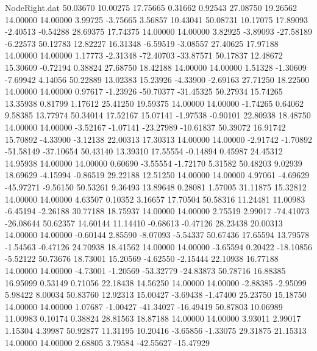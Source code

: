 \begin{filecontents}{NodeRight.dat}
  50.03670   10.00275   17.75665     0.31662    0.92543   27.08750   19.26562   14.00000   14.00000    3.99725   -3.75665    3.56857   10.43041
  50.08731   10.17075   17.89093    -2.40513   -0.54288   28.69375   17.74375   14.00000   14.00000    3.82925   -3.89093  -27.58189   -6.22573
  50.12783   12.82227   16.31348    -6.59519   -3.08557   27.40625   17.97188   14.00000   14.00000    1.17773   -2.31348  -72.40703  -33.87571
  50.17837   12.48672   15.30609    -0.72194    0.38824   27.68750   18.42188   14.00000   14.00000    1.51328   -1.30609   -7.69942    4.14056
  50.22889   13.02383   15.23926    -4.33900   -2.69163   27.71250   18.22500   14.00000   14.00000    0.97617   -1.23926  -50.70377  -31.45325
  50.27934   15.74265   13.35938     0.81799    1.17612   25.41250   19.59375   14.00000   14.00000   -1.74265    0.64062    9.58385   13.77974
  50.34014   17.52167   15.07141    -1.97538   -0.90101   22.80938   18.48750   14.00000   14.00000   -3.52167   -1.07141  -23.27989  -10.61837
  50.39072   16.91742   15.70892    -4.33900   -3.12138   22.00313   17.30313   14.00000   14.00000   -2.91742   -1.70892  -51.58149  -37.10654
  50.43140   13.39310   17.55554    -0.14894    0.45987   24.45312   14.95938   14.00000   14.00000    0.60690   -3.55554   -1.72170    5.31582
  50.48203    9.02939   18.69629    -4.15994   -0.86519   29.22188   12.51250   14.00000   14.00000    4.97061   -4.69629  -45.97271   -9.56150
  50.53261    9.36493   13.89648     0.28081    1.57005   31.11875   15.32812   14.00000   14.00000    4.63507    0.10352    3.16657   17.70504
  50.58316   11.24481   11.00983    -6.45194   -2.26188   30.77188   18.75937   14.00000   14.00000    2.75519    2.99017  -74.41073  -26.08644
  50.62357   14.60144   11.14410    -0.68613   -0.47126   28.23438   20.00313   14.00000   14.00000   -0.60144    2.85590   -8.07093   -5.54337
  50.67436   17.65594   13.79578    -1.54563   -0.47126   24.70938   18.41562   14.00000   14.00000   -3.65594    0.20422  -18.10856   -5.52122
  50.73676   18.73001   15.20569    -4.62550   -2.15444   22.10938   16.77188   14.00000   14.00000   -4.73001   -1.20569  -53.32779  -24.83873
  50.78716   16.88385   16.95099     0.53149    0.71056   22.18438   14.56250   14.00000   14.00000   -2.88385   -2.95099    5.98422    8.00034
  50.83760   12.92313   15.00427    -3.69438   -1.47400   25.23750   15.18750   14.00000   14.00000    1.07687   -1.00427  -41.34027  -16.49419
  50.87803   10.06989   11.00983     0.10174    0.38824   28.81563   18.87188   14.00000   14.00000    3.93011    2.99017    1.15304    4.39987
  50.92877   11.31195   10.20416    -3.65856   -1.33075   29.31875   21.15313   14.00000   14.00000    2.68805    3.79584  -42.55627  -15.47929

\end{filecontents}
